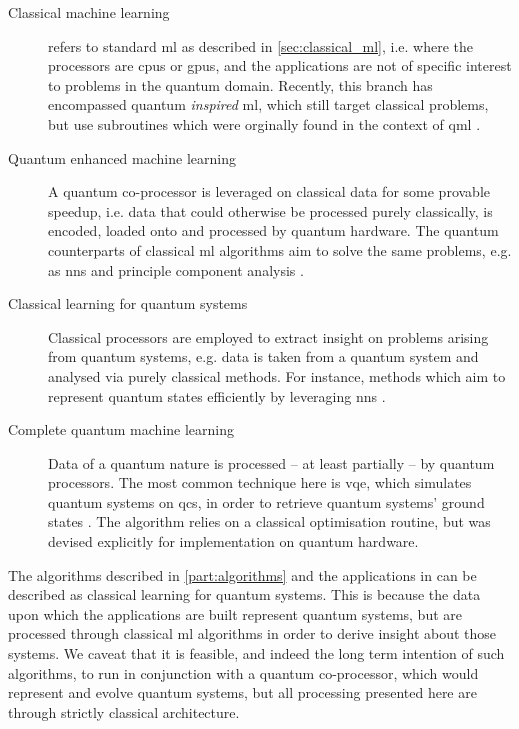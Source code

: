 \begin{description}\label{description:qml}
    \item[Classical machine learning] 
        refers to standard \gls{ml} as described in \cref{sec:classical_ml}, i.e. where the processors are \glspl{cpu} or \glspl{gpu}, 
            and the applications are not of specific interest to problems in the quantum domain. 
        Recently, this branch has encompassed quantum \emph{inspired} \gls{ml}, which still target classical problems, 
            but use subroutines which were orginally found in the context of \gls{qml} \cite{tang2019quantum}.

    \item[Quantum enhanced machine learning] 
        A quantum co-processor is leveraged on classical data for some provable speedup,
        i.e. data that could otherwise be processed purely classically, is encoded, loaded onto and processed by quantum hardware.
        The quantum counterparts of classical \gls{ml} algorithms aim to solve the same problems, 
            e.g. as \glspl{nn} \cite{schuld2014quest, cao2017quantum} and principle component analysis \cite{lloyd2014quantum}. 

    \item[Classical learning for quantum systems] 
        Classical processors are employed to extract insight on problems arising from quantum systems, 
            e.g. data is taken from a quantum system and analysed via purely classical methods.
            For instance, methods which aim to represent quantum states efficiently by leveraging 
            \glspl{nn} \cite{carleo2017solving, torlai2018neural}. 

    \item[Complete quantum machine learning] 
        Data of a quantum nature is processed -- at least partially -- by quantum processors. 
        The most common technique here is \gls{vqe}, which simulates quantum systems on \glspl{qc}, 
        in order to retrieve quantum systems' ground states \cite{peruzzo2014variational}.
        The algorithm relies on a classical optimisation routine, but was devised explicitly for implementation on quantum hardware. 
\end{description}
\par 

The algorithms described in \cref{part:algorithms} and the applications in 
    can be described as classical learning for quantum systems. 
This is because the data upon which the applications are built represent quantum systems, 
    but are processed through classical \gls{ml} algorithms in order to derive insight about those systems.
We caveat that it is feasible, and indeed the long term intention of such algorithms, 
    to run in conjunction with a quantum co-processor, which would represent and evolve quantum systems, 
    but all processing presented here are through strictly classical architecture.

